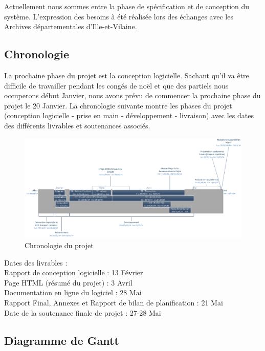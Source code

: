 \documentclass[a4paper]{article}
\begin{document}
	Actuellement nous sommes entre la phase de spécification et de conception du système. L'expression des besoins à été réalisée lors des échanges avec les Archives départementales d’Ille-et-Vilaine.
	
\subsection{Chronologie}

	La prochaine phase du projet est la conception logicielle. Sachant qu'il va être difficile de travailler pendant les congés de noël et que des partiels nous occuperons début Janvier, nous avons prévu de commencer la prochaine phase du projet le 20 Janvier. La chronologie suivante montre les phases du projet (conception logicielle - prise en main - développement - livraison) avec les dates des différents livrables et soutenances associés. 
	
\begin{figure}[H]
\centering
\includegraphics[width=\textwidth]{chronologie.png}
\caption{Chronologie du projet}
\label{fig:chronologie}
\end{figure}

	Dates des livrables : \\
		Rapport de conception logicielle : 13 Février\\
		Page HTML (résumé du projet) : 3 Avril\\
		Documentation en ligne du logiciel : 28 Mai\\
		Rapport Final, Annexes et Rapport de bilan de planification : 21 Mai\\
				
	Date de la soutenance finale de projet : 27-28 Mai\\

\subsection{Diagramme de Gantt}
\end{document}
